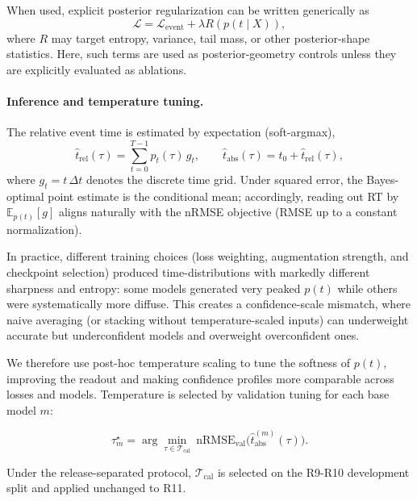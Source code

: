 \documentclass[12pt]{article}
\begin{document}
When used, explicit posterior regularization can be written generically as
\begin{equation}
\label{eq:posterior_regularized_objective}
\mathcal{L} = \mathcal{L}_{\mathrm{event}} + \lambda R\!\left(p(t\mid X)\right),
\end{equation}
where $R$ may target entropy, variance, tail mass, or other posterior-shape statistics. Here, such terms are used as posterior-geometry controls unless they are explicitly evaluated as ablations.

\paragraph{Inference and temperature tuning.}
The relative event time is estimated by expectation (soft-argmax),
\begin{equation}
\label{eq:rt_soft_argmax}
\hat t_{\mathrm{rel}}(\tau)=\sum_{t=0}^{T-1} p_t(\tau)\, g_t,
\qquad
\hat t_{\mathrm{abs}}(\tau)=t_0+\hat t_{\mathrm{rel}}(\tau),
\end{equation}
where $g_t=t\,\Delta t$ denotes the discrete time grid. Under squared error, the Bayes-optimal point estimate is the
conditional mean; accordingly, reading out RT by $\mathbb{E}_{p(t)}[g]$ aligns naturally with the nRMSE objective (RMSE
up to a constant normalization).

In practice, different training choices (loss weighting, augmentation strength, and checkpoint selection) produced
time-distributions with markedly different sharpness and entropy: some models generated very peaked $p(t)$ while others
were systematically more diffuse. This creates a confidence-scale mismatch, where naive averaging (or stacking without
temperature-scaled inputs) can underweight accurate but underconfident models and overweight overconfident ones.

We therefore use post-hoc temperature scaling \citep{guo2017calibration} to tune the softness of $p(t)$, improving the
readout and making confidence profiles more comparable across losses and models.
Temperature is selected by validation tuning for each base model $m$:

\begin{equation}
\label{eq:rt_tau_tuning}
\tau_m^\star = \arg\min_{\tau\in\mathcal{T}_{\text{cal}}}
\ \mathrm{nRMSE}_{\text{val}}\big(\hat t_{\mathrm{abs}}^{(m)}(\tau)\big).
\end{equation}

Under the release-separated protocol, $\mathcal{T}_{\text{cal}}$ is selected on the R9-R10 development split and applied unchanged to R11.
\end{document}
